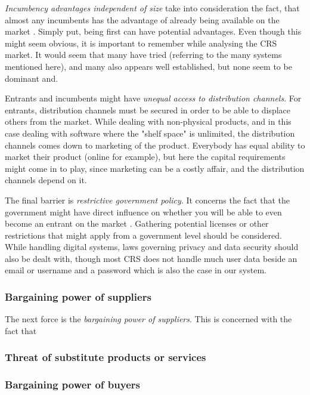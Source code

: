 \emph{Incumbency advantages independent of size} take into consideration the fact, that almost any incumbents has the advantage of already being available on the market \cite[p.~81]{porter2008five}. Simply put, being first can have potential advantages. Even though this might seem obvious, it is important to remember while analysing the CRS market. It would seem that many have tried (referring to the many systems mentioned here), and many also appears well established, but none seem to be dominant and.

Entrants and incumbents might have \emph{unequal access to distribution channels}. For entrants, distribution channels must be secured in order to be able to displace others from the market. While dealing with non-physical products, and in this case dealing with software where the "shelf space" is unlimited, the distribution channels  comes down to marketing of the product. Everybody has equal ability to market their product (online for example), but here the capital requirements might come in to play, since marketing can be a costly affair, and the distribution channels depend on it.

The final barrier is \emph{restrictive government policy}. It concerns the fact that the government might have direct influence on whether you will be able to even become an entrant on the market \cite[p.~82]{porter2008five}. Gathering potential licenses or other restrictions that might apply from a government level should be considered. While handling digital systems, laws governing privacy and data security should also be dealt with, though most CRS does not handle much user data beside an email or username and a password which is also the case in our system.


\subsubsection{Bargaining power of suppliers}
The next force is the \emph{bargaining power of suppliers}. This is concerned with the fact that 

\subsubsection{Threat of substitute products or services}


\subsubsection{Bargaining power of buyers}


















